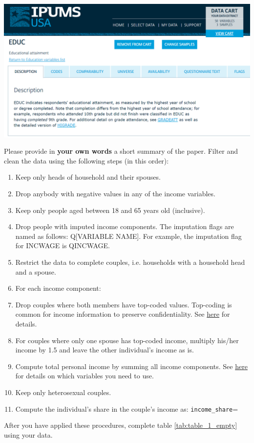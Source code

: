 \documentclass[a4paper, 11pt,addpoints]{exam}
\begin{document}
	\includegraphics[width=.9\textwidth]{screenshot_educ.png}
\eitem 
\newpage
\begin{questions}
	\question[5] 	
	Please provide in \textbf{your own words} a short summary of the paper.  
	\question[15] \label{clean:first} Filter and clean the data using the following steps (in this order):
	\begin{enumerate}[label=(\alph*)]
		\item Keep only heads of household and their spouses.
		\item Drop anybody with negative values in any of the income variables.
		\item Keep only people aged between 18 and 65 years old (inclusive).
		\item Drop people with imputed income components. The imputation flags are named as follows: Q[VARIABLE NAME]. For example, the imputation flag for INCWAGE is QINCWAGE.\label{step:first}
		\item Restrict the data to complete couples, i.e. households with a household head and a spouse.
		\item For each income component: \label{step:last}
		\bitem 
		\item Drop couples where both members have top-coded values.  Top-coding is common for income information to preserve confidentiality. See \href{https://faculty.chicagobooth.edu/-/media/faculty/emir-kamenica/documents/identityonlineappendix.pdf}{here} for details.
		\item For couples where only one spouse has top-coded income, multiply his/her income by 1.5 and leave the other individual's income as is.
		\eitem 
		\item Compute total personal income by summing all income components. See \href{https://usa.ipums.org/usa-action/variables/INCTOT#comparability_section}{here} for details on which variables you need to use.
		\item Keep only heterosexual couples.
		\item Compute the individual's share in the couple's income as:
		\beqn
			{\tt income\_share}=
		\eeqn
	\end{enumerate}
	After you have applied these procedures, complete table \ref{tab:table_1_empty} using your data.
	

\end{questions}
\end{document}
